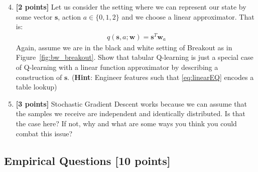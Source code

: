 \documentclass[11pt]{article}
\numberwithin{equation}{section} %
\numberwithin{figure}{section} %
\numberwithin{table}{section} %
\newcommand{\sv}{\mathbf{s}}
\newcommand{\wv}{\mathbf{w}}
\newcommand{\points}[1]{{\bf [#1 points]}}
\begin{document}
\begin{enumerate}
\setcounter{enumi}{3}
\item \textbf{[2 points]} Let us consider the setting where we can represent our state by some vector $\sv$, action $a \in \{0, 1, 2\}$ and we choose a linear approximator. That is:
\begin{align}
\label{eq:linearEQ}
q(\sv, a; \wv) = \sv^T\wv_a
\end{align}
Again, assume we are in the black and white setting of Breakout as in Figure~\ref{fig:bw_breakout}. Show that tabular Q-learning is just a special case of Q-learning with a linear function approximator by describing a construction of $\sv$. (\textbf{Hint}: Engineer features such that \ref{eq:linearEQ} encodes a table lookup)

\begin{tcolorbox}[fit,height=4cm, width=\linewidth, blank, borderline={1pt}{-2pt},nobeforeafter]
\end{tcolorbox}


\item \textbf{[3 points]} Stochastic Gradient Descent works because we can assume that the samples we receive are independent and identically distributed. Is that the case here? If not, why and what are some ways you think you could combat this issue?

\begin{tcolorbox}[fit,height=3cm, width=\linewidth, blank, borderline={1pt}{-2pt},nobeforeafter]
\end{tcolorbox}





\end{enumerate}

\clearpage
\subsection{Empirical Questions \points{10}}
\end{document}
